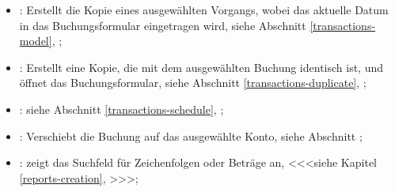 \begin{itemize}
	\item {}: Erstellt die Kopie eines ausgewählten Vorgangs, wobei das aktuelle Datum in das Buchungsformular eingetragen wird, siehe Abschnitt \vref{transactions-model}, ;%
	\item {}: Erstellt eine Kopie, die mit dem ausgewählten Buchung identisch ist, und öffnet das Buchungsformular, siehe Abschnitt \vref{transactions-duplicate}, ;%
	\item {}: siehe Abschnitt \vref{transactions-schedule}, ;%
	\item {}: Verschiebt die Buchung auf das ausgewählte Konto, siehe Abschnitt ;%
	\item {}: zeigt das Suchfeld für Zeichenfolgen oder Beträge an, <<<siehe Kapitel \vref{reports-creation}, >>>;%

\end{itemize}
